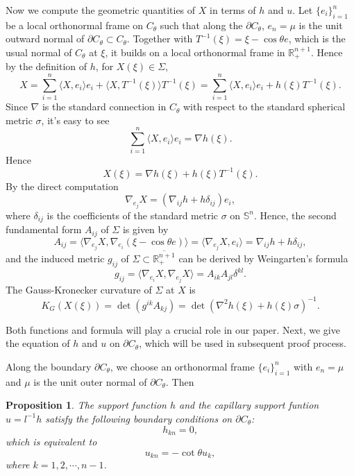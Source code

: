 \documentclass[11pt]{amsart}
\newcommand{\uS}{\mathbb{S}^{n}}
\def\R{{\mathfrak R}}
\def\R{\mathbb R}
\numberwithin{equation} {section}
\numberwithin{equation}{section}
\newtheorem{proposition}[theorem]{\bf Proposition}
\begin{document}
Now we compute the geometric quantities of $X$ in terms of $h$ and $u$. Let $\{e_i\}_{i=1}^n$ be a local orthonormal frame on $C_{\theta}$ such that along the $\partial C_{\theta}$, $e_n = \mu$ is the unit outward normal of $\partial C_{\theta}\subset C_{\theta}$. Together with $T^{-1}(\xi) = \xi -\cos\theta e$, which is the usual normal of $C_{\theta}$ at $\xi$, it builds on a local orthonormal frame in $\R^{n+1}_{+}$. Hence by the definition of $h$, for $X(\xi)\in\Sigma$,
$$X = \sum_{i=1}^n\langle X, e_i\rangle e_i + \langle X, T^{-1}(\xi)\rangle T^{-1}(\xi) = \sum_{i=1}^n\langle X, e_i\rangle e_i + h(\xi)T^{-1}(\xi).$$
Since $\nabla$ is the standard connection in $C_{\theta}$ with respect to the standard spherical metric $\sigma$, it's easy to see
$$\sum_{i=1}^n \langle X, e_i\rangle e_i = \nabla h(\xi).$$
Hence
$$X(\xi) = \nabla h(\xi) + h(\xi)T^{-1}(\xi).$$
By the direct computation
$$\nabla_{e_j}X = (\nabla_{ij}h + h\delta_{ij})e_i,$$
where $\delta_{ij}$ is the coefficients of the standard metric $\sigma$ on $\uS$. Hence, the second fundamental form $A_{ij}$ of $\Sigma$ is given by
$$A_{ij} = \langle \nabla_{e_j}X, \nabla_{e_i}(\xi-\cos\theta e)\rangle = \langle \nabla_{e_j}X, e_i\rangle = \nabla_{ij}h + h\delta_{ij},$$
and the induced metric $g_{ij}$ of $\Sigma\subset\overline{\R^{n+1}_{+}}$ can be derived by Weingarten's formula
$$g_{ij} = \langle \nabla_{e_i}X, \nabla_{e_j}X\rangle = A_{ik}A_{jl}\delta^{kl}.$$
The Gauss-Kronecker curvature of $\Sigma$ at $X$ is 
$$K_{G}(X(\xi)) = \det (g^{ik}A_{kj}) = \det (\nabla ^2 h(\xi)+ h(\xi)\sigma)^{-1}.$$

Both functions and formula will play a crucial role in our paper. 
Next, we give the equation of $h$ and $u$ on $\partial C_{\theta}$, which will be used in subsequent proof process.

Along the boundary $\partial C_{\theta}$, we choose an orthonormal frame $\{e_{i}\}_{i=1}^n$ with $e_n = \mu$ and $\mu$ is the unit outer normal of $\partial C_{\theta}$. Then 

\begin{proposition}\label{pro}
    The support function $h$ and the capillary support funtion $u=l^{-1}h$ satisfy the following boundary conditions on $\partial C_{\theta}$:
    \begin{equation}\label{pro1}
        h_{kn}=0,
    \end{equation}
    which is equivalent to 
    \begin{equation}\label{pro2}
        u_{kn} = -\cot\theta u_{k},
    \end{equation}
    where $k=1,2,\cdots, n-1$.
\end{proposition}
\end{document}
